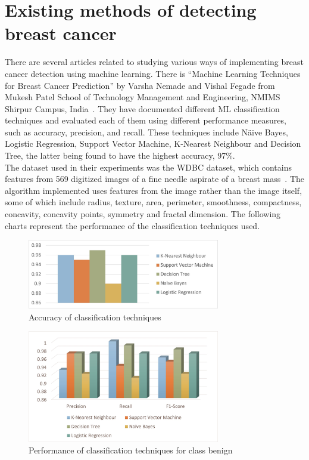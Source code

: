 \chapter{Existing methods of detecting breast cancer}
\label{chap:ch3}

\par There are several articles related to studying various ways of implementing breast cancer detection using machine learning. There is “Machine Learning Techniques for Breast Cancer Prediction” by Varsha Nemade and Vishal Fegade from Mukesh Patel School of Technology Management and Engineering, NMIMS Shirpur Campus, India~\cite{carte2}. They have documented different ML classification techniques and evaluated each of them using different performance measures, such as accuracy, precision, and recall. These techniques include N{\"a}ive Bayes, Logistic Regression, Support Vector Machine, K-Nearest Neighbour and Decision Tree, the latter being found to have the highest accuracy, 97\%.\\
The dataset used in their experiments was the WDBC dataset, which contains features from 569 digitized images of a fine needle aspirate of a breast mass~\cite{link3}. The algorithm implemented uses features from the image rather than the image itself, some of which include radius, texture, area, perimeter, smoothness, compactness, concavity, concavity points, symmetry and fractal dimension. The following charts represent the performance of the classification techniques used.\\
\begin{figure}[h!]
    \centering
    \includegraphics[width=0.75\textwidth]{figures/Figure1.jpg}
    \caption{Accuracy of classification techniques}
    \label{fig:fig1}
\end{figure}
\begin{figure}[h!]
    \centering
    \includegraphics[width=0.75\textwidth]{figures/Figure2.jpg}
    \caption{Performance of classification techniques for class benign}
    \label{fig:fig2}
\end{figure}

